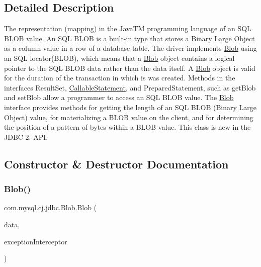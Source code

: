 \subsection{Detailed Description}
The representation (mapping) in the Java\+TM programming language of an S\+QL B\+L\+OB value. An S\+QL B\+L\+OB is a built-\/in type that stores a Binary Large Object as a column value in a row of a database table. The driver implements \mbox{\hyperlink{classcom_1_1mysql_1_1cj_1_1jdbc_1_1_blob}{Blob}} using an S\+QL locator(\+B\+L\+O\+B), which means that a \mbox{\hyperlink{classcom_1_1mysql_1_1cj_1_1jdbc_1_1_blob}{Blob}} object contains a logical pointer to the S\+QL B\+L\+OB data rather than the data itself. A \mbox{\hyperlink{classcom_1_1mysql_1_1cj_1_1jdbc_1_1_blob}{Blob}} object is valid for the duration of the transaction in which is was created. Methods in the interfaces Result\+Set, \mbox{\hyperlink{classcom_1_1mysql_1_1cj_1_1jdbc_1_1_callable_statement}{Callable\+Statement}}, and Prepared\+Statement, such as get\+Blob and set\+Blob allow a programmer to access an S\+QL B\+L\+OB value. The \mbox{\hyperlink{classcom_1_1mysql_1_1cj_1_1jdbc_1_1_blob}{Blob}} interface provides methods for getting the length of an S\+QL B\+L\+OB (Binary Large Object) value, for materializing a B\+L\+OB value on the client, and for determining the position of a pattern of bytes within a B\+L\+OB value. This class is new in the J\+D\+BC 2. A\+PI. 

\subsection{Constructor \& Destructor Documentation}
\mbox{\label{classcom_1_1mysql_1_1cj_1_1jdbc_1_1_blob_afe5823f0f28d6eb7ceac45199d57b31c}} 
\subsubsection{\texorpdfstring{Blob()}{Blob()}}
{\footnotesize\ttfamily com.\+mysql.\+cj.\+jdbc.\+Blob.\+Blob (\begin{DoxyParamCaption}\item[{byte \mbox{[}$\,$\mbox{]}}]{data,  }\item[{\mbox{\hyperlink{interfacecom_1_1mysql_1_1cj_1_1exceptions_1_1_exception_interceptor}{Exception\+Interceptor}}}]{exception\+Interceptor }\end{DoxyParamCaption})}

